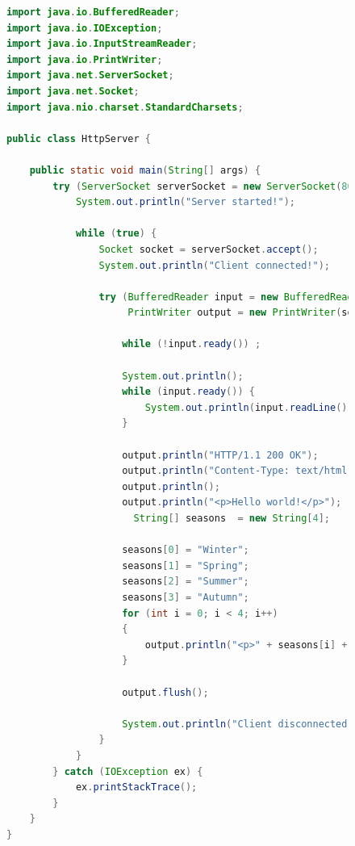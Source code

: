 \documentclass[a4paper, 14pt]{extarticle}
\begin{document}
\begin{figure}[!htb]
\begin{lstlisting}[language={java},caption={Файл HttpServer.java},label={lst:code1}]
import java.io.BufferedReader;
import java.io.IOException;
import java.io.InputStreamReader;
import java.io.PrintWriter;
import java.net.ServerSocket;
import java.net.Socket;
import java.nio.charset.StandardCharsets;

public class HttpServer {

    public static void main(String[] args) {
        try (ServerSocket serverSocket = new ServerSocket(8026)) {
            System.out.println("Server started!");
            
            while (true) {
                Socket socket = serverSocket.accept();
                System.out.println("Client connected!");

                try (BufferedReader input = new BufferedReader(new InputStreamReader(socket.getInputStream(), StandardCharsets.UTF_8));
                     PrintWriter output = new PrintWriter(socket.getOutputStream())) {

                    while (!input.ready()) ;

                    System.out.println();
                    while (input.ready()) {
                        System.out.println(input.readLine());
                    }

                    output.println("HTTP/1.1 200 OK");
                    output.println("Content-Type: text/html; charset=utf-8");
                    output.println();
                    output.println("<p>Hello world!</p>");
		              String[] seasons  = new String[4]; 

                    seasons[0] = "Winter"; 
                    seasons[1] = "Spring"; 
                    seasons[2] = "Summer"; 
                    seasons[3] = "Autumn"; 
                    for (int i = 0; i < 4; i++)
                    {
                        output.println("<p>" + seasons[i] + "</p>");
                    }

                    output.flush();
                    
                    System.out.println("Client disconnected!");
                }
            }
        } catch (IOException ex) {
            ex.printStackTrace();
        }
    }
}

\end{lstlisting}
\end{figure}
\end{document}
